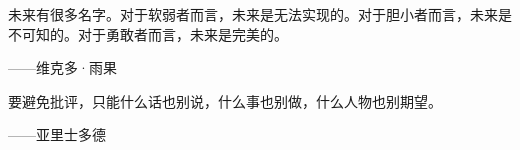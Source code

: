 

\begin{BookQuote}
未来有很多名字。对于软弱者而言，未来是无法实现的。对于胆小者而言，未来是不可知的。对于勇敢者而言，未来是完美的。

\hfill ——维克多·雨果
\end{BookQuote}

\begin{BookQuote}
要避免批评，只能什么话也别说，什么事也别做，什么人物也别期望。

\hfill ——亚里士多德
\end{BookQuote}
